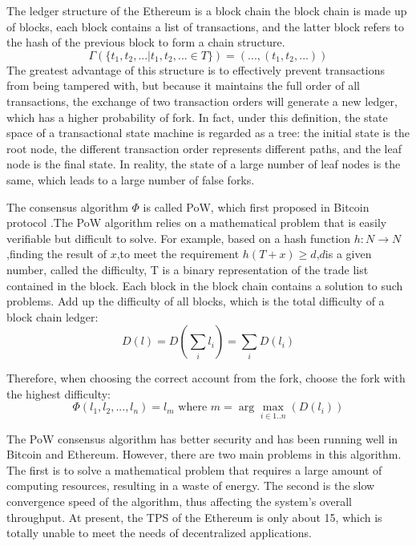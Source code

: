 \documentclass[UTF8,nofonts]{article}
\begin{document}
\begin{multicols}{2}
The ledger structure of the Ethereum is a block chain \cite{nakamoto2008bitcoin}the block chain is made up of blocks, each block contains a list of transactions, and the latter block refers to the hash of the previous block to form a chain structure.
\begin{equation}
\Gamma(\lbrace t_{1}, t_{2},...\vert t_{1}, t_{2},... \in T \rbrace) = (..., (t_{1}, t_{2},...)) 
\end{equation}
The greatest advantage of this structure is to effectively prevent transactions from being tampered with, but because it maintains the full order of all transactions, the exchange of two transaction orders will generate a new ledger, which has a higher probability of fork. In fact, under this definition, the state space of a transactional state machine is regarded as a tree: the initial state is the root node, the different transaction order represents different paths, and the leaf node is the final state. In reality, the state of a large number of leaf nodes is the same, which leads to a large number of false forks.

The consensus algorithm $\Phi$ is called PoW, which first proposed in Bitcoin protocol \cite{nakamoto2008bitcoin}.The PoW algorithm relies on a mathematical problem that is easily verifiable but difficult to solve. For example, based on a hash function $h:N \rightarrow N$,finding the result of $x$,to meet the requirement $h(T+x) \geq d$,$d$is a given number, called the difficulty, T is a binary representation of the trade list contained in the block. Each block in the block chain contains a solution to such problems. Add up the difficulty of all blocks, which is the total difficulty of a block chain ledger:
\begin{equation}
D(l) = D(\sum_{i} l_{i}) = \sum_{i} D(l_{i})
\end{equation}

Therefore, when choosing the correct account from the fork, choose the fork with the highest difficulty:
\begin{equation}
 \Phi (l_{1}, l_{2}, ..., l_{n}) = l_{m} \text{ where } m = \arg\max_{i \in 1..n}(D(l_{i}))
\end{equation}

The PoW consensus algorithm has better security and has been running well in Bitcoin and Ethereum. However, there are two main problems in this algorithm. The first is to solve a mathematical problem that requires a large amount of computing resources, resulting in a waste of energy. The second is the slow convergence speed of the algorithm, thus affecting the system's overall throughput. At present, the TPS of the Ethereum is only about 15, which is totally unable to meet the needs of decentralized applications.


\end{multicols}
\end{document}
